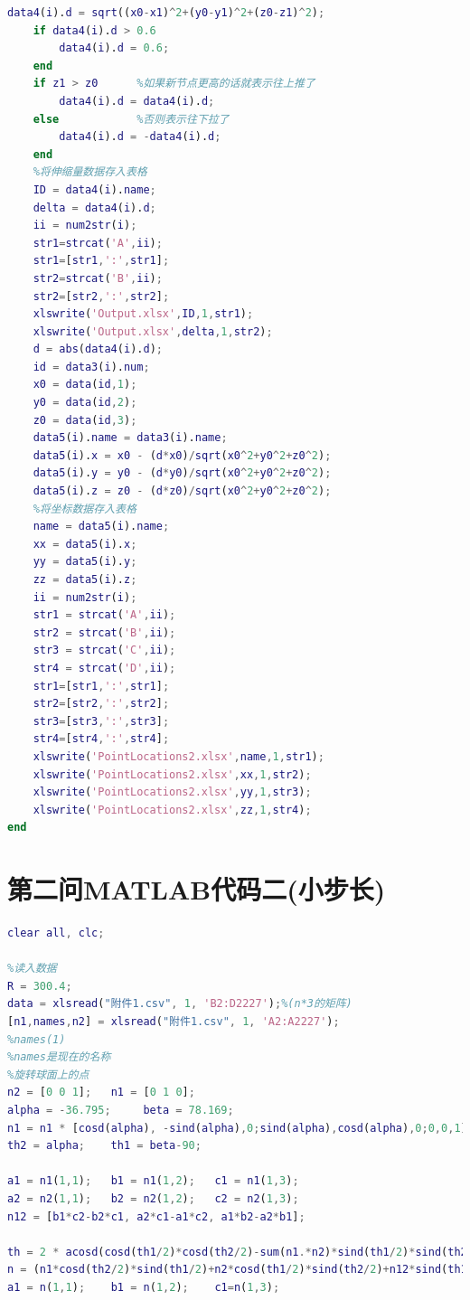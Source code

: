 \documentclass[withoutpreface,bwprint]{cumcmthesis} %
\begin{document}
\begin{appendices}
\begin{lstlisting}[language=matlab]
    data4(i).d = sqrt((x0-x1)^2+(y0-y1)^2+(z0-z1)^2);
    if data4(i).d > 0.6
        data4(i).d = 0.6;
    end
    if z1 > z0      %如果新节点更高的话就表示往上推了
        data4(i).d = data4(i).d;
    else            %否则表示往下拉了
        data4(i).d = -data4(i).d;
    end
    %将伸缩量数据存入表格
    ID = data4(i).name;
    delta = data4(i).d;
    ii = num2str(i);
    str1=strcat('A',ii);
    str1=[str1,':',str1];
    str2=strcat('B',ii);
    str2=[str2,':',str2];
    xlswrite('Output.xlsx',ID,1,str1);
    xlswrite('Output.xlsx',delta,1,str2);
    d = abs(data4(i).d);
    id = data3(i).num;
    x0 = data(id,1);
    y0 = data(id,2);
    z0 = data(id,3);
    data5(i).name = data3(i).name;
    data5(i).x = x0 - (d*x0)/sqrt(x0^2+y0^2+z0^2);
    data5(i).y = y0 - (d*y0)/sqrt(x0^2+y0^2+z0^2);
    data5(i).z = z0 - (d*z0)/sqrt(x0^2+y0^2+z0^2);
    %将坐标数据存入表格
    name = data5(i).name;
    xx = data5(i).x;
    yy = data5(i).y;
    zz = data5(i).z;
    ii = num2str(i);
    str1 = strcat('A',ii);
    str2 = strcat('B',ii);
    str3 = strcat('C',ii);
    str4 = strcat('D',ii);
    str1=[str1,':',str1];
    str2=[str2,':',str2];
    str3=[str3,':',str3];
    str4=[str4,':',str4];
    xlswrite('PointLocations2.xlsx',name,1,str1);
    xlswrite('PointLocations2.xlsx',xx,1,str2);
    xlswrite('PointLocations2.xlsx',yy,1,str3);
    xlswrite('PointLocations2.xlsx',zz,1,str4);
end

\end{lstlisting}
\section{第二问MATLAB代码二(小步长)}
\begin{lstlisting}[language=matlab]
clear all, clc;

%读入数据
R = 300.4;
data = xlsread("附件1.csv", 1, 'B2:D2227');%(n*3的矩阵)
[n1,names,n2] = xlsread("附件1.csv", 1, 'A2:A2227');
%names(1)
%names是现在的名称
%旋转球面上的点
n2 = [0 0 1];   n1 = [0 1 0];   
alpha = -36.795;     beta = 78.169;
n1 = n1 * [cosd(alpha), -sind(alpha),0;sind(alpha),cosd(alpha),0;0,0,1]
th2 = alpha;    th1 = beta-90;

a1 = n1(1,1);   b1 = n1(1,2);   c1 = n1(1,3);
a2 = n2(1,1);   b2 = n2(1,2);   c2 = n2(1,3);
n12 = [b1*c2-b2*c1, a2*c1-a1*c2, a1*b2-a2*b1];

th = 2 * acosd(cosd(th1/2)*cosd(th2/2)-sum(n1.*n2)*sind(th1/2)*sind(th2/2));
n = (n1*cosd(th2/2)*sind(th1/2)+n2*cosd(th1/2)*sind(th2/2)+n12*sind(th1/2)*sind(th2/2))/sind(th/2);
a1 = n(1,1);    b1 = n(1,2);    c1=n(1,3);


\end{lstlisting}
\end{appendices}
\end{document}
